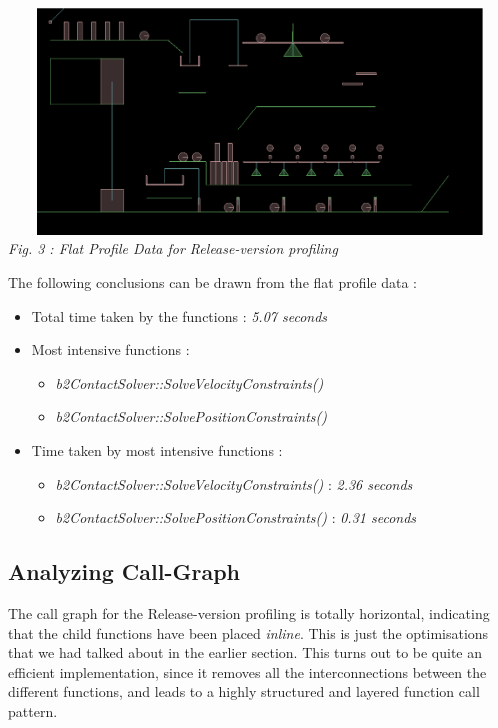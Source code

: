 \documentclass[a4paper,11pt]{article}
\begin{document}
\begin{center}
\includegraphics[width=195mm, height=60mm]{state_00.eps}\\
\emph{Fig. 3 : Flat Profile Data for Release-version profiling}
\end{center}

The following conclusions can be drawn from the flat profile data :

\begin{itemize}

\item Total time taken by the functions : \emph{5.07 seconds}
\item Most intensive functions : 
\begin{itemize}
\item \emph{b2ContactSolver::SolveVelocityConstraints()}
\item \emph{b2ContactSolver::SolvePositionConstraints()}
\end{itemize}
\item Time taken by most intensive functions : 
\begin{itemize}
\item \emph{b2ContactSolver::SolveVelocityConstraints()} : \emph{2.36 seconds}
\item \emph{b2ContactSolver::SolvePositionConstraints()} : \emph{0.31 seconds}
\end{itemize}

\end{itemize}

\subsection{Analyzing Call-Graph}

The call graph for the Release-version profiling is totally horizontal, indicating that the child functions have been placed \emph{inline}. This is just the optimisations that we had talked about in the earlier section. This turns out to be quite an efficient implementation, since it removes all the interconnections between the different functions, and leads to a highly structured and layered function call pattern.
\end{document}
